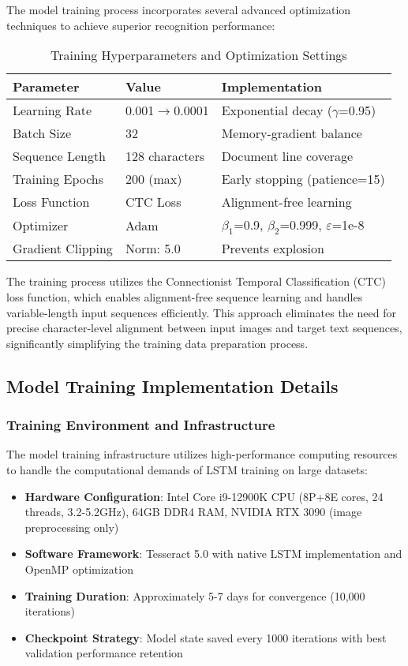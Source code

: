 The model training process incorporates several advanced optimization techniques to achieve superior recognition performance:

\begin{table}[H]
\centering
\caption{Training Hyperparameters and Optimization Settings}
\label{tab:training_config}
{\begin{tabular}{lll}
\toprule
\textbf{Parameter} & \textbf{Value} & \textbf{Implementation} \\
\midrule
Learning Rate & 0.001$\rightarrow$0.0001 & Exponential decay ($\gamma$=0.95) \\
Batch Size & 32 & Memory-gradient balance \\
Sequence Length & 128 characters & Document line coverage \\
Training Epochs & 200 (max) & Early stopping (patience=15) \\
Loss Function & CTC Loss & Alignment-free learning \\
Optimizer & Adam & $\beta_1$=0.9, $\beta_2$=0.999, $\varepsilon$=1e-8 \\
Gradient Clipping & Norm: 5.0 & Prevents explosion \\
\bottomrule
\end{tabular}}
\end{table}

The training process utilizes the Connectionist Temporal Classification (CTC) loss function, which enables alignment-free sequence learning and handles variable-length input sequences efficiently. This approach eliminates the need for precise character-level alignment between input images and target text sequences, significantly simplifying the training data preparation process.

\subsection{Model Training Implementation Details}

\subsubsection{Training Environment and Infrastructure}

The model training infrastructure utilizes high-performance computing resources to handle the computational demands of LSTM training on large datasets:

\begin{itemize}
\item \textbf{Hardware Configuration}: Intel Core i9-12900K CPU (8P+8E cores, 24 threads, 3.2-5.2GHz), 64GB DDR4 RAM, NVIDIA RTX 3090 (image preprocessing only)
\item \textbf{Software Framework}: Tesseract 5.0 with native LSTM implementation and OpenMP optimization
\item \textbf{Training Duration}: Approximately 5-7 days for convergence (10,000 iterations)
\item \textbf{Checkpoint Strategy}: Model state saved every 1000 iterations with best validation performance retention
\end{itemize}

